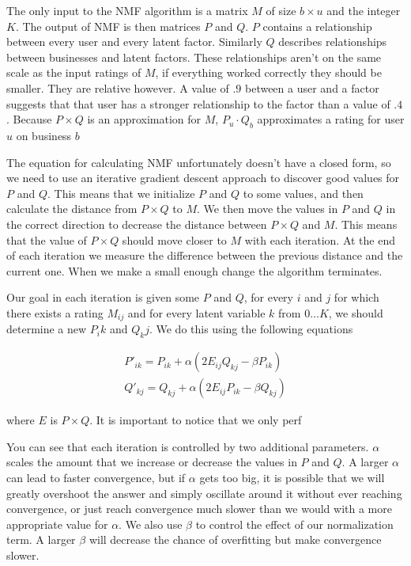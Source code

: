 The only input to the NMF algorithm is a matrix $M$ of size $b \times u$ and the
integer $K$. The output of NMF is then matrices $P$ and $Q$. $P$ contains a
relationship between every user and every latent factor. Similarly $Q$ describes
relationships between businesses and latent factors. These relationships aren't
on the same scale as the input ratings of $M$, if everything worked correctly
they should be smaller. They are relative however. A value of $.9$ between a
user and a factor suggests that that user has a stronger relationship to the
factor than a value of $.4$. Because $P \times Q$ is an approximation for $M$,
$P_u \cdot Q_b$ approximates a rating for user $u$ on business $b$

The equation for calculating NMF unfortunately doesn't have a closed form, so we
need to use an iterative gradient descent approach to discover good values for
$P$ and $Q$. This means that we initialize $P$ and $Q$ to some values, and then
calculate the distance from $P \times Q$ to $M$. We then move the values in $P$
and $Q$ in the correct direction to decrease the distance between $P \times Q$
and $M$. This means that the value of $P \times Q$ should move closer to $M$
with each iteration. At the end of each iteration we measure the difference
between the previous distance and the current one. When we make a small enough
change the algorithm terminates.

Our goal in each iteration is given some $P$ and $Q$, for every $i$ and $j$ for
which there exists a rating $M_{ij}$ and for every latent variable $k$ from
$0\ldots K$, we should determine a new $P_ik$ and $Q_kj$. We do this using the
following equations

\[
\begin{array}{c}
P'_{ik}=P_{ik} + \alpha(2E_{ij}Q_{kj}-\beta P_{ik}) \\
Q'_{kj}=Q_{kj} + \alpha(2E_{ij}P_{ik}-\beta Q_{kj})
\end{array}
\]

\noindent where $E$ is $P \times Q$. It is important to notice that we only perf

You can see that each iteration is controlled by two additional parameters.
$\alpha$ scales the amount that we increase or decrease the values in $P$ and $Q$. A larger $\alpha$
can lead to faster convergence, but if $\alpha$ gets too big, it is possible that
we will greatly overshoot the answer and simply oscillate around it without ever
reaching convergence, or just reach convergence much slower than we would with a
more appropriate value for $\alpha$. We also use $\beta$ to control the effect
of our normalization term. A larger $\beta$ will decrease the chance of
overfitting but make convergence slower.

